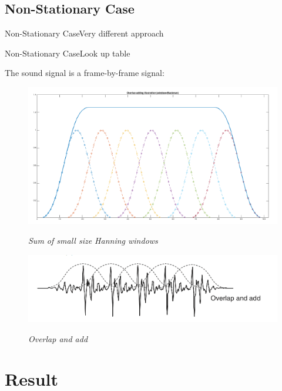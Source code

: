 \documentclass{bredelebeamer}
\begin{document}
\subsection{Non-Stationary Case}
\begin{frame}{Non-Stationary Case}{Very different approach}

\end{frame}
\begin{frame}{Non-Stationary Case}{Look up table}

The sound signal is  a frame-by-frame signal: \\

\begin{figure}

	{\includegraphics[scale=0.3]{overlap2.png}}
	\caption{\it Sum of small size Hanning windows}
\end{figure}
\begin{figure}
	{\includegraphics[scale=0.25]{overlap1.png}}
	\caption{\it Overlap and add}
\end{figure}
\end{frame}


\section{Result}
\end{document}
